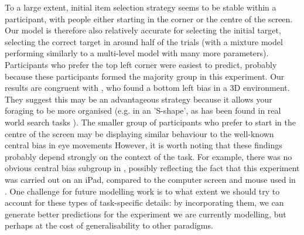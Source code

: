 \documentclass[preprints, article,submit,pdftex,moreauthors]{Definitions/mdpi}
\begin{document}
To a large extent, initial item selection strategy seems to be stable within a participant, with people either starting in the corner or the centre of the screen. Our model is therefore also relatively accurate for selecting the initial target, selecting the correct target in around half of the trials (with a mixture model performing similarly to a multi-level model with many more parameters). Participants who prefer the top left corner were easiest to predict, probably because these participants formed the majority group in this experiment. Our results are congruent with \citep{kristjansson2022moving}, who found a bottom left bias in a 3D environment. They suggest this may be an advantageous strategy because it allows your foraging to be more organised (e.g. in an 'S-shape', as has been found in real world search tasks \citep{riggs2017importance}). The smaller group of participants who prefer to start in the centre of the screen may be displaying similar behaviour to the well-known central bias in eye movements \citep{tatler2007central, tseng2009quantifying, clarke2014deriving} However, it is worth noting that these findings probably depend strongly on the context of the task. For example, there was no obvious central bias subgroup in \citep{kristjansson2014}, possibly reflecting the fact that this experiment was carried out on an iPad, compared to the computer screen and mouse used in \citep{clarke2022}. One challenge for future modelling work is to what extent we should try to account for these types of task-specific details: by incorporating them, we can generate better predictions for the experiment we are currently modelling, but perhaps at the cost of generalisability to other paradigms.
\end{document}
